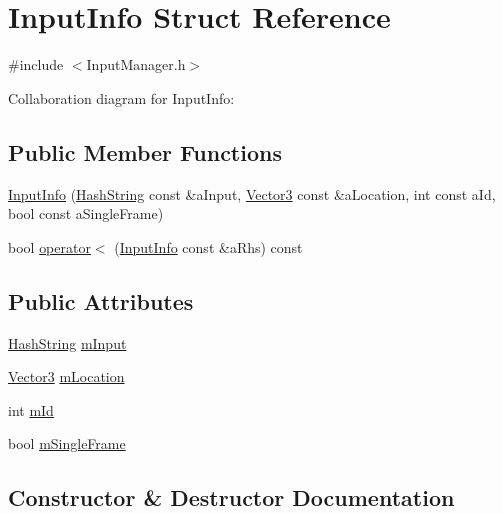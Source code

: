 \hypertarget{structInputInfo}{}\section{Input\+Info Struct Reference}
\label{structInputInfo}


{\ttfamily \#include $<$Input\+Manager.\+h$>$}



Collaboration diagram for Input\+Info\+:
\subsection*{Public Member Functions}
\begin{DoxyCompactItemize}
\item 
\hyperlink{structInputInfo_aa379864815a9cb159a1fb196b89d4c07}{Input\+Info} (\hyperlink{classHashString}{Hash\+String} const \&a\+Input, \hyperlink{structVector3}{Vector3} const \&a\+Location, int const a\+Id, bool const a\+Single\+Frame)
\item 
bool \hyperlink{structInputInfo_ac3f789191a3ce91dbc755d35b9bd63c3}{operator$<$} (\hyperlink{structInputInfo}{Input\+Info} const \&a\+Rhs) const 
\end{DoxyCompactItemize}
\subsection*{Public Attributes}
\begin{DoxyCompactItemize}
\item 
\hyperlink{classHashString}{Hash\+String} \hyperlink{structInputInfo_ab717d6336deb41d9624d65ba8c95abd8}{m\+Input}
\item 
\hyperlink{structVector3}{Vector3} \hyperlink{structInputInfo_aeb13d259ccdadc3d60bc5711ac23aa35}{m\+Location}
\item 
int \hyperlink{structInputInfo_aa9a747ebf019888e0a23cdfff3dbbce6}{m\+Id}
\item 
bool \hyperlink{structInputInfo_a2522512a2247f8595e4161c52a83efdb}{m\+Single\+Frame}
\end{DoxyCompactItemize}


\subsection{Constructor \& Destructor Documentation}
